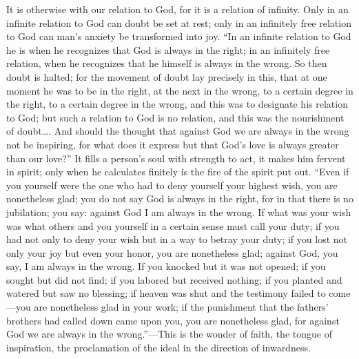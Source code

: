 \documentclass[12pt,a4paper,openany]{book}
\newcommand{\opage}[1]{\marginnote{\footnotesize\textit{[#1]}}}
\begin{document}
It is otherwise with our relation to God, for it is a relation of
infinity. Only in an infinite relation to God can doubt be set at rest;
only in an infinitely free relation to God can man's anxiety be
transformed into joy.
``In an infinite relation to God he is when he recognizes that God is
always in the right; in an \opage{55}infinitely free relation, when he recognizes
that he himself is always in the wrong. So then doubt is halted; for the
movement of doubt lay precisely in this, that at one moment he was to be
in the right, at the next in the wrong, to a certain degree in the right,
to a certain degree in the wrong, and this was to designate his relation
to God; but such a relation to God is no relation, and this was the
nourishment of doubt\dots{}. And should the thought that against God we are
always in the wrong not be inspiring, for what does it express but that
God's love is always greater than our love?'' It fills a person's soul
with strength to act, it makes him fervent in spirit; only when he
calculates finitely is the fire of the spirit put out. ``Even if you
yourself were the one who had to deny yourself your highest wish, you are
nonetheless glad; you do not say God is always in the right, for in that
there is no jubilation; you say: against God I am always in the wrong. If
what was your wish was what others and you yourself in a certain sense
must call your duty; if you had not only to deny your wish but in a way
to betray your duty; if you lost not only your joy but even your honor,
you are nonetheless glad; against God, you say, I am always in the wrong.
If you knocked but it was not opened; if you sought but did not find; if
you labored but received nothing; if you planted and watered but saw no
blessing; if heaven was shut and the testimony failed to come---you are
nonetheless glad in your work; if the punishment that the fathers'
brothers had called down came upon you, you are nonetheless glad, for
against God we are always in the wrong.''---This is the wonder of faith,
the tongue of inspiration, the proclamation of the ideal in the direction
of inwardness.
\end{document}
